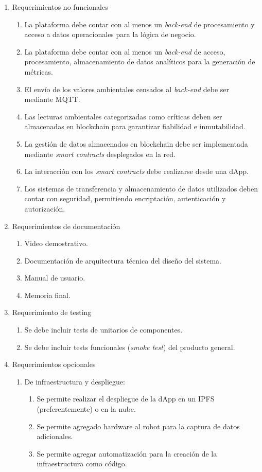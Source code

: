 \begin{enumerate}
					
	\item Requerimientos no funcionales		
	\begin{enumerate}	
		\item La plataforma debe contar con al menos un \textit{back-end} de procesamiento y acceso a datos operacionales para la lógica de negocio.
		\item La plataforma debe contar con al menos un \textit{back-end} de acceso, procesamiento, almacenamiento de datos analíticos para la generación de métricas.		
		\item El envío de los valores ambientales censados al \textit{back-end} debe ser mediante MQTT.
		\item Las lecturas ambientales categorizadas como críticas deben ser almacenadas en blockchain para garantizar fiabilidad e inmutabilidad.
		\item La gestión de datos almacenados en blockchain debe ser implementada mediante \textit{smart contracts} desplegados en la red.
		\item La interacción con los \textit{smart contracts} debe realizarse desde una dApp.
		\item Los sistemas de transferencia y almacenamiento de datos utilizados deben contar con seguridad, permitiendo encriptación, autenticación y autorización.	
		\end{enumerate}	
		
	\item Requerimientos de documentación		
		\begin{enumerate}			
			\item Video demostrativo.	
			\item Documentación de arquitectura técnica del diseño del sistema.			
			\item Manual de usuario.	
			\item Memoria final.	
		\end{enumerate}	
		

		
		
	\item Requerimiento de testing		
		\begin{enumerate}			
			\item Se debe incluir tests de unitarios de componentes.
			\item Se debe incluir tests funcionales (\textit{smoke test}) del producto general.		
		\end{enumerate}	
	
	\item Requerimientos opcionales		
		\begin{enumerate}			
			\item De infraestructura y despliegue:
				\begin{enumerate}			
					\item Se permite realizar el despliegue de la dApp en un IPFS (preferentemente) o en la nube.					
					\item Se permite agregado hardware al robot para la captura de datos adicionales.
					\item Se permite agregar automatización para la creación de la infraestructura como código.
				\end{enumerate}			
			

\end{enumerate}
\end{enumerate}
